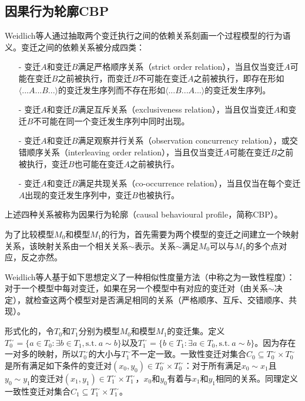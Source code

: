 \subsection{因果行为轮廓CBP}\label{subsec:cbp}
Weidlich等人通过抽取两个变迁执行之间的依赖关系刻画一个过程模型的行为语义\cite{weidlich2011efficient,weidlich2010efficient}。变迁之间的依赖关系被分成四类：
\begin{itemize}
  \item[-] 变迁$A$和变迁$B$满足严格顺序关系（strict order relation），当且仅当变迁$A$可能在变迁$B$之前被执行，而变迁$B$不可能在变迁$A$之前被执行，即存在形如$\langle ...A...B...\rangle$的变迁发生序列而不存在形如$\langle ...B...A...\rangle$的变迁发生序列。
  \item[-] 变迁$A$和变迁$B$满足互斥关系（exclusiveness relation），当且仅当变迁$A$和变迁$B$不可能在同一个变迁发生序列中同时出现。
  \item[-] 变迁$A$和变迁$B$满足观察并行关系（observation concurrency relation），或交错顺序关系\cite{weidlich2011efficient}（interleaving order relation），当且仅当变迁$A$可能在变迁$B$之前被执行，变迁$B$也可能在变迁$A$之前被执行。
  \item[-] 变迁$A$和变迁$B$满足共现关系（co-occurrence relation），当且仅当在每个变迁$A$出现的变迁发生序列中，变迁$B$也被执行。
\end{itemize}
上述四种关系被称为因果行为轮廓（causal behavioural profile，简称CBP）。

为了比较模型$M_{0}$和模型$M_{1}$的行为，首先需要为两个模型的变迁之间建立一个映射关系，该映射关系由一个相关关系$\sim$表示。关系$\sim$满足$M_{0}$可以与$M_{1}$的多个点对应，反之亦然。

Weidlich等人基于如下思想定义了一种相似性度量方法（中称之为一致性程度）：对于一个模型中每对变迁，如果在另一个模型中有对应的变迁对（由关系$\sim$决定），就检查这两个模型对是否满足相同的关系（严格顺序、互斥、交错顺序、共现）。

形式化的，令$T_{0}$和$T_{1}$分别为模型$M_{0}$和模型$M_{1}$的变迁集。定义$T_{0}^{\sim}=\{a\in T_{0}:\exists b\in T_{1},\text{s.t.}~a\sim b\}$以及$T_{1}^{\sim}=\{b\in T_{1}:\exists a\in T_{0},\text{s.t.}~a\sim b\}$。因为存在一对多的映射，所以$T_{0}^{\sim}$的大小与$T_{1}^{\sim}$不一定一致。一致性变迁对集合$C_{0}\subseteq T_{0}^{\sim}\times T_{0}^{\sim}$是所有满足如下条件的变迁对$(x_{0},y_{0})\in T_{0}^{\sim}\times T_{0}^{\sim}$：对于所有满足$x_{0}\sim x_{1}$且$y_{0}\sim y_{1}$的变迁对$(x_{1},y_{1})\in T_{1}^{\sim}\times T_{1}^{\sim}$，$x_{0}$和$y_{0}$有着与$x_{1}$和$y_{1}$相同的关系。同理定义一致性变迁对集合$C_{1}\subseteq T_{1}^{\sim}\times T_{1}^{\sim}$。

